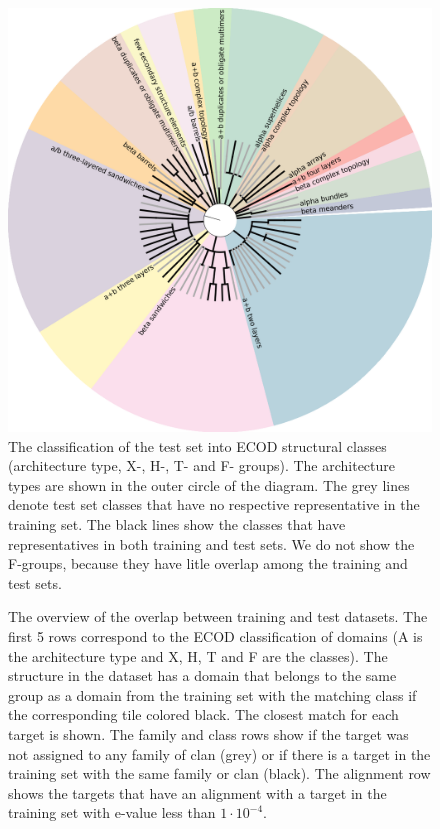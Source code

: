 \documentclass[a4paper,10pt]{article}
\begin{document}
\begin{figure}[H]
    \centering
    \includegraphics[width=\linewidth]{Fig/folds_graph.png}
    \caption{The classification of the test set into ECOD structural classes (architecture type, X-, H-, T- and F- groups). The architecture 
    types are shown in the outer circle of the diagram. The grey lines denote test set classes that have no respective representative in the 
    training set. The black lines show the classes that have representatives in both training and test sets. We do not show the F-groups, because
    they have litle overlap among the training and test sets.}
    \label{Fig:foldsGraph}
\end{figure}

\begin{figure}[H]
    \caption{The overview of the overlap between training and test datasets. The first 5 rows correspond to the ECOD classification of 
    domains (A is the architecture type and X, H, T and F are the classes). The structure in the dataset has
    a domain that belongs to the same group as a domain from the training set with the matching class if the corresponding tile colored black.
    The closest match for each target is shown. The family and class rows show if the target was not assigned to any family of clan (grey) or 
    if there is a target in the training set with the same family or clan (black). The alignment row shows the targets that have an alignment
    with a target in the training set with e-value less than $1\cdot10^{-4}$.}
    \label{Fig:summaryTable}
\end{figure}
\end{document}

